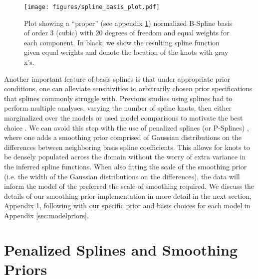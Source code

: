 \begin{figure}[ht!]
    \begin{centering}
        \texttt{[image: figures/spline\_basis\_plot.pdf]}
        \caption{Plot showing a ``proper'' (see appendix \ref{sec:psplines}) normalized B-Spline basis of order 3 (cubic) with 20 degrees of freedom and equal weights for each component. 
        In black, we show the resulting spline function given equal weights and denote the location of the knots with gray x's.}
        \label{fig:spline_basis}
    \end{centering}
\end{figure}

Another important feature of basis splines is that under appropriate prior conditions, one can alleviate sensitivities to arbitrarily 
chosen prior specifications that splines commonly struggle with. Previous studies using splines had to perform multiple analyses, varying the 
number of spline knots, then either marginalized over the models or used model comparisons to motivate the best choice \citep{Edelman_2022ApJ}. 
We can avoid this step with the use of penalized splines (or P-Splines) \citep{eilers2021practical,BayesianPSplines,Jullion2007RobustSO}, 
where one adds a smoothing prior comprised of Gaussian distributions on the differences between neighboring basis spline coefficients. 
This allows for knots to be densely populated across the domain without the worry of extra variance in the inferred spline functions. 
When also fitting the scale of the smoothing prior (i.e. the width of the Gaussian distributions on the differences), the data will inform the model 
of the preferred the scale of smoothing required. We discuss the details of our smoothing prior implementation in more detail in the next section, 
Appendix \ref{sec:psplines}, following with our specific prior and basis choices for each model in Appendix \ref{sec:modelpriors}.

\section{Penalized Splines and Smoothing Priors}\label{sec:psplines}

